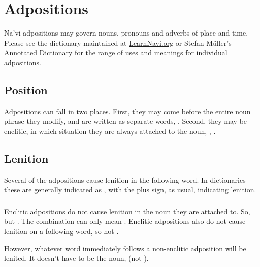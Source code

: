 \section{Adpositions}
\noindent Na'vi adpositions may govern nouns, pronouns and adverbs
of place and time.  Please see the dictionary maintained at
\href{https://learnnavi.org/navi-vocabulary/}{LearnNavi.org} or Stefan
Müller's 
\href{https://forum.learnnavi.org/projects/an-annotated-dictionary-(draft)/}{Annotated Dictionary}
for the range of uses and meanings for individual adpositions.

\subsection{Position} Adpositions can fall in two places.  First,
they may come before the entire noun phrase they modify, and are
written as separate words, 
  .  Second, they may
be enclitic, in which situation they are always attached to the noun,
 ,
 .\label{syn:adp:position}

\subsection{Lenition} Several of the adpositions
cause lenition in the following word.  In dictionaries these are
generally indicated as , with the plus sign, as usual,
indicating lenition.

\subsubsection{} Enclitic adpositions do not cause lenition in the
noun they are attached to.  So,   but
.  The combination  can only mean .  Enclitic adpositions also do not cause lenition on a
following word, so  
not .

However, whatever word immediately follows a non-enclitic adposition
will be lenited.  It doesn't have to be the noun, 
 (not ).

